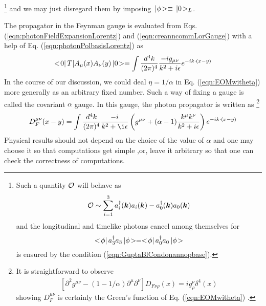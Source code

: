 \footnote{%
Such a quantity ${\cal O}$ will behave as
\begin{eqnarray*}
{\cal O} \sim \sum_{i = 1}^3 a^\dagger_i(\mbox{\boldmath $k$}) a_i(\mbox{\boldmath $k$})
-
a^\dagger_0(\mbox{\boldmath $k$}) a_0(\mbox{\boldmath $k$})
\end{eqnarray*}
and the longitudinal and timelike photons cancel among themselves
for 
\[<\! \phi |\, a_3^\dagger a_3 \,| \phi \!>
=<\! \phi |\, a_0^\dagger a_0 \,| \phi \!>
\]
is ensured by the condition (\ref{eqn:GuptaBlCondonannopbase}).
}%
 and we may just disregard
them by imposing $\,| \phi \!> \equiv \,| 0 \!>_L$.

The propagator in the Feynman gauge is evaluated from
Eqs. (\ref{eqn:photonFieldExpansionLorentz}) and (\ref{eqn:creanncommLorGauge})
with a help of Eq. (\ref{eqn:photonPolbasisLorentz}) as
\begin{eqnarray}
<\! 0 |\,
T[
A_\mu (x) A_\nu (y)
\,| 0 \!>
=
\int
\frac{d^4 k}{(2\pi)^4}
\frac{-i g_{\mu \nu}}
{k^2 + i\epsilon}
e^{-ik \cdot (x - y)}
\label{eqn:photonProp}
\end{eqnarray}
In the course of our discussion, we could deal $\eta = 1/\alpha$ 
in Eq. (\ref{eqn:EOMwitheta}) more generally as an arbitrary fixed number.
Such a way of fixing a gauge is called the covariant  $\alpha$ gauge.
In this gauge, the photon propagator is written as
\footnote{%
It is straightforward to observe
\begin{eqnarray}
\left[
\partial^2 g^{\mu \nu} - \left(
1 - 1/\alpha \right)
\partial^\mu \partial^\nu
\right]
D_{F\nu \rho}(x)
= i g^\nu_{\!\rho} \delta^4(x) 
\end{eqnarray}
showing $D_F^{\mu \nu}$ is certainly the Green's function of 
Eq. (\ref{eqn:EOMwitheta}) .
}%
\begin{eqnarray}
D_F^{\mu \nu}(x - y)
=
\int
\frac{d^4 k}{(2\pi)^4}
\frac{-i}
{k^2 + \i\epsilon}
\left(
g^{\mu \nu} + (\alpha - 1)
\frac{k^\mu k^\nu}{k^2+ i\epsilon}
\right)
e^{-ik \cdot (x - y)}
\label{eqn:photonPropalpha}
\end{eqnarray}
Physical results should not depend on the choice of the value of $\alpha$
and one may choose it so that computations get simple
,or, leave it arbitrary so that  one can check the correctness of computations.
